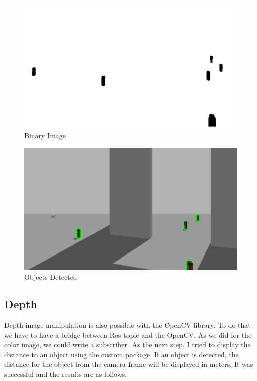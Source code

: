 \documentclass[twoside,12pt,times,onecolumn,a4paper]{report}
\begin{document}
\begin{figure}[H]
  \centering
   \includegraphics[width=15cm]{binary}
  \caption{Binary Image}
\end{figure}

\begin{figure}[H]
  \centering
   \includegraphics[width=15cm]{detected}
  \caption{Objects Detected}
\end{figure}

\subsection{Depth}

Depth image manipulation is also possible with the OpenCV library. To do 
that we have to have a bridge between Ros topic and the OpenCV. As we did for the 
color image, we could write a subscriber. As the next step, I tried to display the 
distance to an object using the custom package. If an object is detected, the 
distance for the object from the camera frame will be displayed in meters. It was 
successful and the results are as follows.
\end{document}
